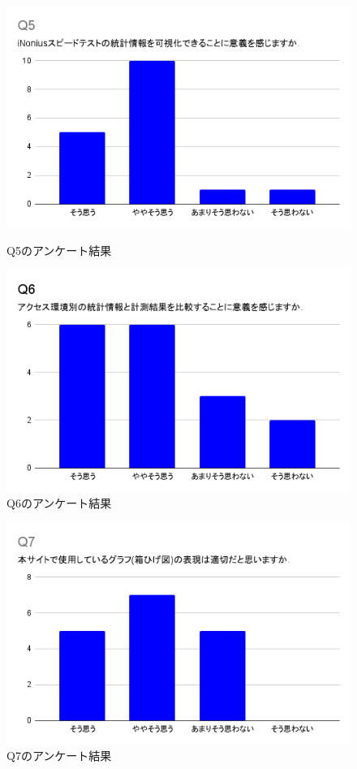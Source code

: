 \begin{figure}[htbp]
    \centering
    \includegraphics[width=1.0\textwidth]{fig/Q5.png}
    \caption{Q5のアンケート結果}
    \label{fig:Q5}

    \includegraphics[width=1.0\textwidth]{fig/Q6.png}
    \caption{Q6のアンケート結果}
    \label{fig:Q6}
\end{figure}
\FloatBarrier

\begin{figure}[htbp]
    \centering
    \includegraphics[width=1.0\textwidth]{fig/Q7.png}
    \caption{Q7のアンケート結果}
    \label{fig:Q7}
\end{figure}
\FloatBarrier

